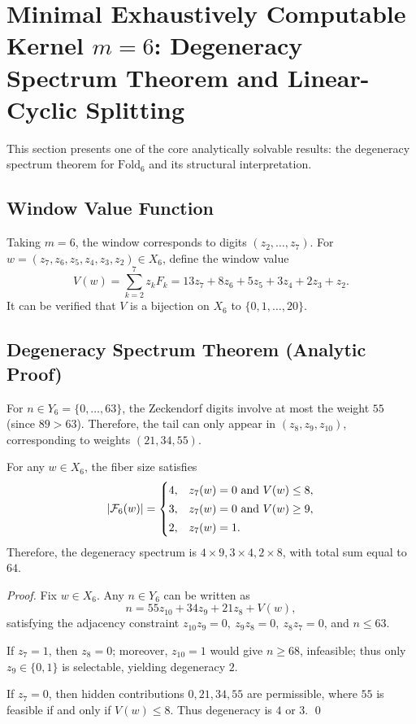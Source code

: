 \section{Minimal Exhaustively Computable Kernel \texorpdfstring{$m=6$}{m=6}: Degeneracy Spectrum Theorem and Linear-Cyclic Splitting}

This section presents one of the core analytically solvable results: the degeneracy spectrum theorem for $\mathrm{Fold}_6$ and its structural interpretation.

\subsection{Window Value Function}

Taking $m=6$, the window corresponds to digits $(z_2,\dots,z_7)$. For $w=(z_7,z_6,z_5,z_4,z_3,z_2)\in X_6$, define the window value
\[
V(w)=\sum_{k=2}^{7} z_k F_k
=13 z_7 + 8 z_6 + 5 z_5 + 3 z_4 + 2 z_3 + z_2.
\]
It can be verified that $V$ is a bijection on $X_6$ to $\{0,1,\dots,20\}$.

\subsection{Degeneracy Spectrum Theorem (Analytic Proof)}

For $n\in Y_6=\{0,\dots,63\}$, the Zeckendorf digits involve at most the weight $55$ (since $89>63$). Therefore, the tail can only appear in $(z_8,z_9,z_{10})$, corresponding to weights $(21,34,55)$.

\begin{theorem}\label{thm:deg-spectrum-6}
For any $w\in X_6$, the fiber size satisfies
\[
\left\lvert \mathcal{F}_6(w)\right\rvert=
\begin{cases}
4, & z_7(w)=0\ \text{and}\ V(w)\le 8,\\[2pt]
3, & z_7(w)=0\ \text{and}\ V(w)\ge 9,\\[2pt]
2, & z_7(w)=1.
\end{cases}
\]
Therefore, the degeneracy spectrum is $4\times 9,3\times 4,2\times 8$, with total sum equal to $64$.
\end{theorem}

\begin{proof}
Fix $w\in X_6$. Any $n\in Y_6$ can be written as
\[
n=55 z_{10}+34 z_9+21 z_8 + V(w),
\]
satisfying the adjacency constraint $z_{10}z_9=0,\ z_9z_8=0,\ z_8z_7=0$, and $n\le 63$.

If $z_7=1$, then $z_8=0$; moreover, $z_{10}=1$ would give $n\ge 68$, infeasible; thus only $z_9\in\{0,1\}$ is selectable, yielding degeneracy $2$.

If $z_7=0$, then hidden contributions $0,21,34,55$ are permissible, where $55$ is feasible if and only if $V(w)\le 8$. Thus degeneracy is $4$ or $3$. \qed
\end{proof}

